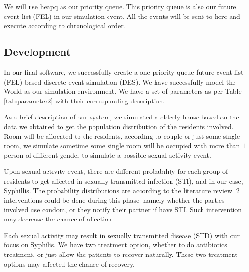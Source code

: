 \documentclass{article}
\begin{document}
\begin{normalsize}
    We will use heapq as our priority queue. This priority queue is also our future event list (FEL) in our simulation event. All the events will be sent to here and execute according to chronological order.
     
	\subsection{Development}
	In our final software, we successfully create a one priority queue future event list (FEL) based discrete event simulation (DES).  
	We have successfully model the World as our simulation environment. We have a set of parameters as per Table \ref{tab:parameter2} with their corresponding description.
	
	As a brief description of our system, we simulated a elderly house based on the data we obtained to get the population distribution of the residents involved. Room will be allocated to the residents, according to couple or just some single room, we simulate sometime some single room will be occupied with more than $1$ person of different gender to simulate a possible sexual activity event.
	
	Upon sexual activity event, there are different probability for each group of residents to get affected in sexually transmitted infection (STI), and in our case, Syphillis. The probability distributions are according to the literature review. $2$ interventions could be done during this phase, namely whether the parties involved use condom, or they notify their partner if have STI. Such intervention may decrease the chance of affection.
	
	Each sexual activity may result in sexually transmitted disease (STD) with our focus on Syphilis. We have two treatment option, whether to do antibiotics treatment, or just allow the patients to recover naturally. These two treatment options may affected the chance of recovery.
	     

\end{normalsize}
\end{document}
